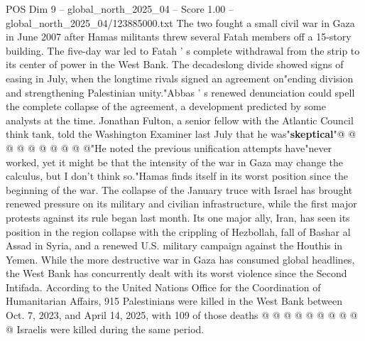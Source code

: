 \begin{textsample}{POS Dim 9 – global\_north\_2025\_04 – Score 1.00 – global\_north\_2025\_04/123885000.txt}
The two fought a small civil war in Gaza in June 2007 after Hamas militants threw several Fatah members off a 15-story building.
The five-day war led to Fatah ' s complete withdrawal from the strip to its center of power in the West Bank.
The decadeslong divide showed signs of easing in July, when the longtime rivals signed an agreement on"ending division and strengthening Palestinian unity."Abbas ' s renewed denunciation could spell the complete collapse of the agreement, a development predicted by some analysts at the time.
Jonathan Fulton, a senior fellow with the Atlantic Council think tank, told the Washington Examiner last July that he was"\textbf{skeptical}"@ @ @ @ @ @ @ @ @ @"He noted the previous unification attempts have"never worked, yet it might be that the intensity of the war in Gaza may change the calculus, but I don't think so."Hamas finds itself in its worst position since the beginning of the war.
The collapse of the January truce with Israel has brought renewed pressure on its military and civilian infrastructure, while the first major protests against its rule began last month.
Its one major ally, Iran, has seen its position in the region collapse with the crippling of Hezbollah, fall of Bashar al Assad in Syria, and a renewed U.S. military campaign against the Houthis in Yemen.
While the more destructive war in Gaza has consumed global headlines, the West Bank has concurrently dealt with its worst violence since the Second Intifada.
According to the United Nations Office for the Coordination of Humanitarian Affairs, 915 Palestinians were killed in the West Bank between Oct. 7, 2023, and April 14, 2025, with 109 of those deaths @ @ @ @ @ @ @ @ @ @ Israelis were killed during the same period.

\end{textsample}
